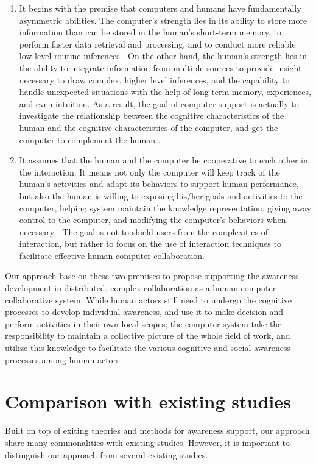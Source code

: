\begin{enumerate}
   \item It begins with the premise that computers and humans have fundamentally asymmetric abilities. The computer's strength lies in its ability to store more information than can be stored in the human's short-term memory, to perform faster data retrieval and processing, and to conduct more reliable low-level routine inferences \cite{Brown99activeuser}. On the other hand, the human's strength lies in the ability to integrate information from multiple sources to provide insight necessary to draw complex, higher level inferences, and the capability to handle unexpected situations with the help of long-term memory, experiences, and even intuition. As a result, the goal of computer support is actually to investigate the relationship between the cognitive characteristics of the human and the cognitive characteristics of the computer, and get the computer to complement the human \cite{Dalal1994}.
   \item It assumes that the human and the computer be cooperative to each other in the interaction. It means not only the computer will keep track of the human's activities and adapt its behaviors to support human performance, but also the human is willing to exposing his/her goals and activities to the computer, helping system maintain the knowledge representation, giving away control to the computer, and modifying the computer's behaviors when necessary \cite{Terveen1995}. The goal is not to shield users from the complexities of interaction, but rather to focus on the use of interaction techniques to facilitate effective human-computer collaboration.
\end{enumerate}

Our approach base on these two premises to propose supporting the awareness development in distributed, complex collaboration as a human computer collaborative system. While human actors still need to undergo the cognitive processes to develop individual awareness, and use it to make decision and perform activities in their own local scopes; the computer system take the responsibility to maintain a collective picture of the whole field of work, and utilize this knowledge to facilitate the various cognitive and social awareness processes among human actors.

\section{Comparison with existing studies} %
\label{sec:comparison_with_existing_studies}
Built on top of exiting theories and methods for awareness support, our approach share many commonalities with existing studies. However, it is important to distinguish our approach from several existing studies.

